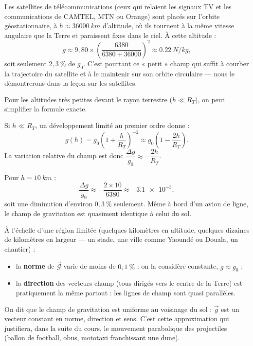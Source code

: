 \documentclass[11pt]{article}
\newcommand{\cle}[1]{{\popxbold\color{popdark}#1}}
\newcounter{popsec}
\newcounter{popsub}
\newcommand{\courssub}[1]{%
  \stepcounter{popsub}%
  \par\vspace{9pt}\noindent{\popxbold\fontsize{11.5}{13}\selectfont\color{popink}{\color{poporange}\thepopsec.\thepopsub}\hspace{6pt}#1}\par\nopagebreak\vspace{4pt}
}
\begin{document}
\begin{savaistu}
Les satellites de télécommunications (ceux qui relaient les signaux TV et les communications de CAMTEL, MTN ou Orange) sont placés sur l'orbite géostationnaire, à $h \approx \SI{36000}{km}$ d'altitude, où ils tournent à la même vitesse angulaire que la Terre et paraissent fixes dans le ciel. À cette altitude :
\[ g \approx 9{,}80 \times \left(\frac{6380}{6380 + 36000}\right)^2 \approx \SI{0,22}{N/kg}, \]
soit seulement $2{,}3\ \%$ de $g_0$. C'est pourtant ce « petit » champ qui suffit à courber la trajectoire du satellite et à le maintenir sur son orbite circulaire — nous le démontrerons dans la leçon sur les satellites.
\end{savaistu}

\courssub{Approximation au voisinage du sol}

Pour les altitudes très petites devant le rayon terrestre ($h \ll R_T$), on peut simplifier la formule exacte.

\begin{propriete}
Si $h \ll R_T$, un développement limité au premier ordre donne :
\[ g(h) = g_0\left(1 + \frac{h}{R_T}\right)^{-2} \approx g_0\left(1 - \frac{2h}{R_T}\right). \]
La variation relative du champ est donc $\dfrac{\Delta g}{g_0} \approx -\dfrac{2h}{R_T}$.
\end{propriete}

\begin{exemplebox}
Pour $h = \SI{10}{km}$ :
\[ \frac{\Delta g}{g_0} \approx -\frac{2 \times 10}{6380} \approx -\num{3,1e-3}, \]
soit une diminution d'environ $0{,}3\ \%$ seulement. Même à bord d'un avion de ligne, le champ de gravitation est quasiment identique à celui du sol.
\end{exemplebox}

\begin{aretenir}
À l'échelle d'une région limitée (quelques kilomètres en altitude, quelques dizaines de kilomètres en largeur — un stade, une ville comme Yaoundé ou Douala, un chantier) :
\begin{itemize}
\item la \textbf{norme} de $\vec{\mathcal{G}}$ varie de moins de $0{,}1\ \%$ : on la considère constante, $g \approx g_0$ ;
\item la \textbf{direction} des vecteurs champ (tous dirigés vers le centre de la Terre) est pratiquement la même partout : les lignes de champ sont quasi parallèles.
\end{itemize}
On dit que le champ de gravitation est \cle{uniforme} au voisinage du sol : $\vec{g}$ est un vecteur constant en norme, direction et sens. C'est cette approximation qui justifiera, dans la suite du cours, le mouvement parabolique des projectiles (ballon de football, obus, mototaxi franchissant une dune).
\end{aretenir}
\end{document}
